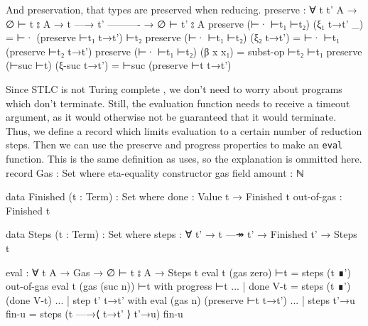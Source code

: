 \documentclass[logo,bsc,singlespacing,parskip,online]{infthesis}
\renewenvironment{code}{\mintedcopy[breaklines,breaksymbolleft=\;]{agda}}{\endmintedcopy}
\begin{document}
And preservation, that types are preserved when reducing.
\begin{code}
  preserve : ∀ {t t' A}
    → ∅ ⊢ t ⦂ A
    → t —→ t'
      ----------
    → ∅ ⊢ t' ⦂ A
  preserve (⊢· ⊢t₁ ⊢t₂) (ξ₁ t→t' _) = ⊢· (preserve ⊢t₁ t→t') ⊢t₂
  preserve (⊢· ⊢t₁ ⊢t₂) (ξ₂ t→t') = ⊢· ⊢t₁  (preserve ⊢t₂ t→t')
  preserve (⊢· ⊢t₁ ⊢t₂) (β x x₁) = subst-op ⊢t₂ ⊢t₁
  preserve (⊢suc ⊢t) (ξ-suc t→t') = ⊢suc (preserve ⊢t t→t')
\end{code}

Since STLC is not Turing complete \citep{church_formulation_1940}, we don't need to worry about
programs which don't terminate. Still, the evaluation function needs to receive a timeout argument,
as it would otherwise not be guaranteed that it would terminate. Thus, we define a record which
limits evaluation to a certain number of reduction steps. Then we can use the preserve and progress
properties to make an \texttt{eval} function. This is the same definition as
\citet{wadler_programming_2022} uses, so the explanation is ommitted here.
\begin{code}
  record Gas : Set where
    eta-equality
    constructor gas
    field
      amount : ℕ

  data Finished (t : Term) : Set where
    done : Value t → Finished t
    out-of-gas : Finished t

  data Steps (t : Term) : Set where
    steps : ∀ {t'} → t —↠ t' → Finished t' → Steps t

  eval : ∀ {t A} → Gas → ∅ ⊢ t ⦂ A → Steps t
  eval {t} (gas zero) ⊢t = steps (t ∎') out-of-gas
  eval {t} (gas (suc n)) ⊢t with progress ⊢t
  ... | done V-t = steps (t ∎') (done V-t)
  ... | step {t'} t→t' with eval (gas n) (preserve ⊢t t→t')
  ...   | steps t'→u fin-u = steps (t —→⟨ t→t' ⟩ t'→u) fin-u
\end{code}
\end{document}
